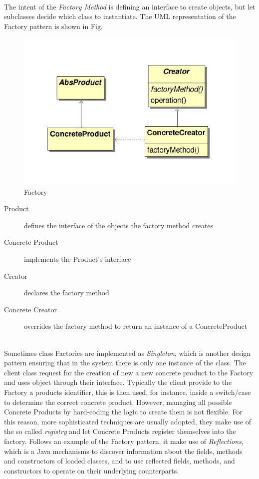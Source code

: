 \paragraph{} The intent of the \textit{Factory Method} is defining an interface to create objects, but let subclasses decide which class to instantiate. The UML representation of the Factory pattern is shown in Fig.

\begin{figure}[h]
\centering
\includegraphics[width=.7\textwidth]{Figs/factory2.png}
\caption{Factory}
\label{fig:factory}
\end{figure}

\begin{description}
\item[Product] defines the interface of the objects the factory method creates
\item[Concrete Product] implements the Product’s interface
\item[Creator]declares the factory method
\item[Concrete Creator] overrides the factory method to return an instance of a
ConcreteProduct
\end{description}
\noindent
\\
Sometimes class Factories are implemented as \textit{Singleton}, which is another design pattern ensuring that in the system there is only one instance of the class. The client class request for the creation of new a new concrete product to the Factory and uses object through their interface. Typically the client provide to the Factory a products identifier, this is then used, for instance, inside a switch/case to determine the correct concrete product. However, managing all possible Concrete Products by hard-coding the logic to create them is not flexible. For this reason, more sophisticated techniques are usually adopted, they make use of the so called \textit{registry} and let Concrete Products register themselves into the factory. Follows an example of the Factory pattern, it make use of \textit{Reflections}, which is a Java mechanisms to discover information about the fields, methods and constructors of loaded classes, and to use reflected fields, methods, and constructors to operate on their underlying counterparts.

